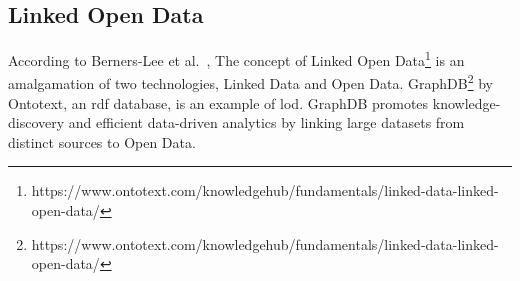 \begin{doublespace}
\section{Linked Open Data}
\par According to Berners-Lee et al.~\cite{aghaei2012evolution},  The concept of Linked Open Data\footnote{https://www.ontotext.com/knowledgehub/fundamentals/linked-data-linked-open-data/} is an amalgamation of two technologies, Linked Data and Open Data. GraphDB\footnote{https://www.ontotext.com/knowledgehub/fundamentals/linked-data-linked-open-data/} by Ontotext, an \ac{rdf} database, is an example of \ac{lod}. GraphDB promotes knowledge-discovery and efficient data-driven analytics by linking large datasets from distinct sources to Open Data.

\end{doublespace}
